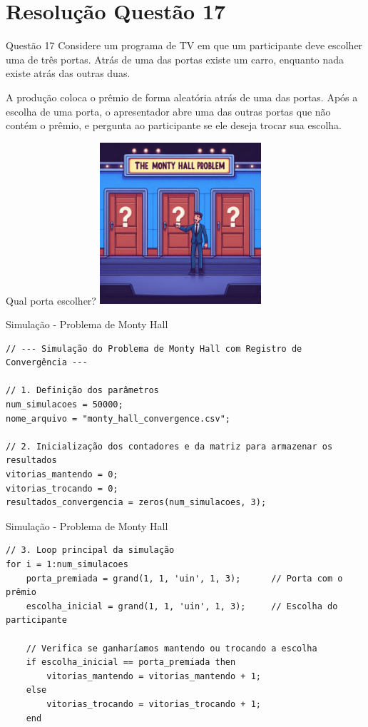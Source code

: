 \section{Resolução Questão 17}

\begin{frame}{Questão 17}
Considere um programa de TV em que um participante deve escolher uma de três portas. Atrás de uma das portas existe um carro, enquanto nada existe atrás das outras duas.

\vspace{0.3cm}
A produção coloca o prêmio de forma aleatória atrás de uma das portas. Após a escolha de uma porta, o apresentador abre uma das outras portas que não contém o prêmio, e pergunta ao participante se ele deseja trocar sua escolha.
\end{frame}

\begin{frame}{Qual porta escolher?}
\centering
\includegraphics[width=0.45\textwidth]{figures/MontyHall.jpeg}
\end{frame}

\begin{frame}[fragile]{Simulação - Problema de Monty Hall}
\begin{lstlisting}
// --- Simulação do Problema de Monty Hall com Registro de Convergência ---

// 1. Definição dos parâmetros
num_simulacoes = 50000;
nome_arquivo = "monty_hall_convergence.csv";

// 2. Inicialização dos contadores e da matriz para armazenar os resultados
vitorias_mantendo = 0;
vitorias_trocando = 0;
resultados_convergencia = zeros(num_simulacoes, 3);

\end{lstlisting}
\end{frame}

\begin{frame}[fragile]{Simulação - Problema de Monty Hall}
\begin{lstlisting}
// 3. Loop principal da simulação
for i = 1:num_simulacoes
    porta_premiada = grand(1, 1, 'uin', 1, 3);      // Porta com o prêmio
    escolha_inicial = grand(1, 1, 'uin', 1, 3);     // Escolha do participante

    // Verifica se ganharíamos mantendo ou trocando a escolha
    if escolha_inicial == porta_premiada then
        vitorias_mantendo = vitorias_mantendo + 1;
    else
        vitorias_trocando = vitorias_trocando + 1;
    end

\end{lstlisting}
\end{frame}

